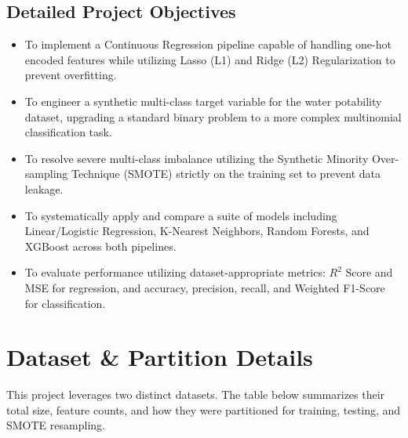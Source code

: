 \documentclass[12pt, a4paper]{article}
\begin{document}
\subsection{Detailed Project Objectives}
\begin{itemize}[label=\textcolor{primaryblue}{$\bullet$}, leftmargin=*]
    \item To implement a Continuous Regression pipeline capable of handling one-hot encoded features while utilizing Lasso (L1) and Ridge (L2) Regularization to prevent overfitting.
    \item To engineer a synthetic multi-class target variable for the water potability dataset, upgrading a standard binary problem to a more complex multinomial classification task.
    \item To resolve severe multi-class imbalance utilizing the Synthetic Minority Over-sampling Technique (SMOTE) strictly on the training set to prevent data leakage.
    \item To systematically apply and compare a suite of models including Linear/Logistic Regression, K-Nearest Neighbors, Random Forests, and XGBoost across both pipelines.
    \item To evaluate performance utilizing dataset-appropriate metrics: $R^2$ Score and MSE for regression, and accuracy, precision, recall, and Weighted F1-Score for classification.
\end{itemize}

\section{Dataset \& Partition Details}
This project leverages two distinct datasets. The table below summarizes their total size, feature counts, and how they were partitioned for training, testing, and SMOTE resampling.
\end{document}
